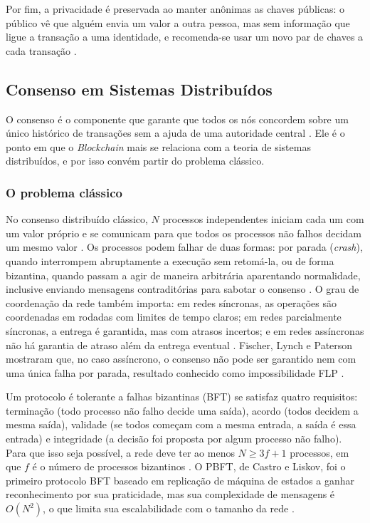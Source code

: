 Por fim, a privacidade é preservada ao manter anônimas as chaves públicas: o público vê que alguém envia um valor a outra pessoa, mas sem informação que ligue a transação a uma identidade, e recomenda-se usar um novo par de chaves a cada transação \cite{nakamoto2008bitcoin}.

\subsection{Consenso em Sistemas Distribuídos}
\label{subsec:consenso}

O consenso é o componente que garante que todos os nós concordem sobre um único histórico de transações sem a ajuda de uma autoridade central \cite{Xiao2020}. Ele é o ponto em que o \textit{Blockchain} mais se relaciona com a teoria de sistemas distribuídos, e por isso convém partir do problema clássico.

\subsubsection{O problema clássico}

No consenso distribuído clássico, $N$ processos independentes iniciam cada um com um valor próprio e se comunicam para que todos os processos não falhos decidam um mesmo valor \cite{Xiao2020}. Os processos podem falhar de duas formas: por parada (\textit{crash}), quando interrompem abruptamente a execução sem retomá-la, ou de forma bizantina, quando passam a agir de maneira arbitrária aparentando normalidade, inclusive enviando mensagens contraditórias para sabotar o consenso \cite{Lamport1982,Xiao2020}. O grau de coordenação da rede também importa: em redes síncronas, as operações são coordenadas em rodadas com limites de tempo claros; em redes parcialmente síncronas, a entrega é garantida, mas com atrasos incertos; e em redes assíncronas não há garantia de atraso além da entrega eventual \cite{Xiao2020}. Fischer, Lynch e Paterson mostraram que, no caso assíncrono, o consenso não pode ser garantido nem com uma única falha por parada, resultado conhecido como impossibilidade FLP \cite{Fischer1985,Xiao2020}.

Um protocolo é tolerante a falhas bizantinas (BFT) se satisfaz quatro requisitos: terminação (todo processo não falho decide uma saída), acordo (todos decidem a mesma saída), validade (se todos começam com a mesma entrada, a saída é essa entrada) e integridade (a decisão foi proposta por algum processo não falho). Para que isso seja possível, a rede deve ter ao menos $N \geq 3f + 1$ processos, em que $f$ é o número de processos bizantinos \cite{Xiao2020}. O PBFT, de Castro e Liskov, foi o primeiro protocolo BFT baseado em replicação de máquina de estados a ganhar reconhecimento por sua praticidade, mas sua complexidade de mensagens é $O(N^2)$, o que limita sua escalabilidade com o tamanho da rede \cite{Castro1999,Xiao2020}.

